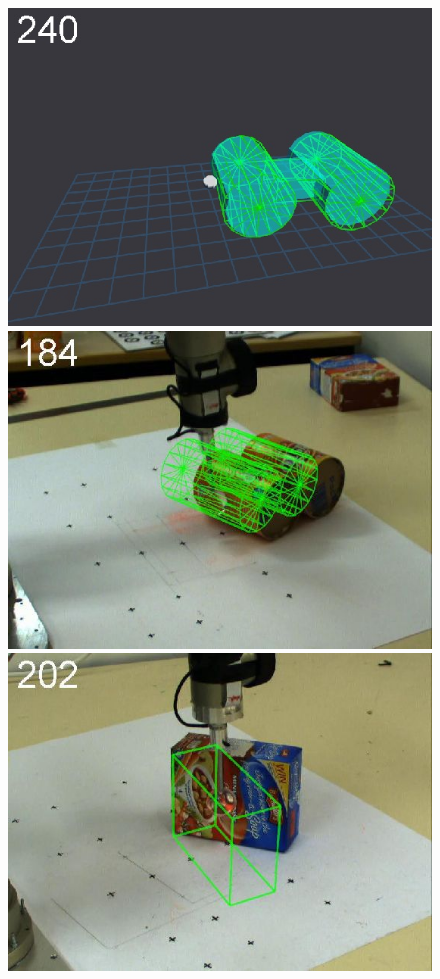 \begin{figure}[t]
{\includegraphics[width=\imgCXwid]{./C5_3exp_6_4}
\includegraphics[width=\imgCXwid]{./C2_3exp_75_4}
\includegraphics[width=\imgCXwid]{./C1_1exp_87_4}
}
\end{figure}
